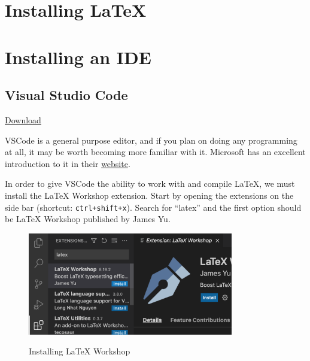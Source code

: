 \section{Installing \LaTeX}
\section{Installing an IDE}
\subsection{Visual Studio Code}
\href{https://code.visualstudio.com/}{Download}

VSCode is a general purpose editor, and if you plan on doing any programming at all, it may be worth becoming more familiar with it.
Microsoft has an excellent introduction to it in their \href{https://code.visualstudio.com/docs}{website}.

In order to give VSCode the ability to work with and compile \LaTeX{}, we must install the LaTeX Workshop extension.
Start by opening the extensions on the side bar (shortcut: \texttt{ctrl+shift+x}).
Search for ``latex'' and the first option should be LaTeX Workshop published by James Yu.

\begin{figure}[h]
\centering
    \includegraphics[width=0.8\textwidth]{figures/extension.png}
\label{fig:extension}
\caption{Installing LaTeX Workshop}
\end{figure}

